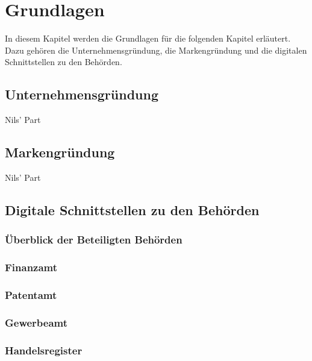 \newpage

\section{Grundlagen} \label{grundlagen}
In diesem Kapitel werden die Grundlagen für die folgenden Kapitel erläutert. Dazu gehören die Unternehmensgründung, die Markengründung und die digitalen Schnittstellen zu den Behörden.


\subsection{Unternehmensgründung} \label{unternehmensgründung}

Nils' Part
\subsection{Markengründung} \label{markengründung}

Nils' Part

\subsection{Digitale Schnittstellen zu den Behörden} \label{digitaleBehoerden}

\subsubsection{Überblick der Beteiligten Behörden} \label{ueberblickDerBeteiligtenBehoerden}

\subsubsection{Finanzamt} \label{finanzamt}

\subsubsection{Patentamt} \label{patentamt}

\subsubsection{Gewerbeamt} \label{gewerbeamt}

\subsubsection{Handelsregister} \label{handelsregister}


